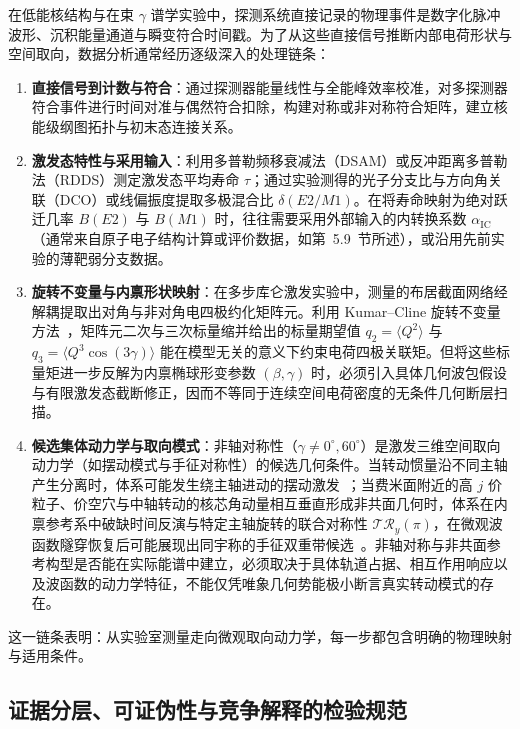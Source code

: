 在低能核结构与在束 $\gamma$ 谱学实验中，探测系统直接记录的物理事件是数字化脉冲波形、沉积能量通道与瞬变符合时间戳。为了从这些直接信号推断内部电荷形状与空间取向，数据分析通常经历逐级深入的处理链条：
\begin{enumerate}
    \item \textbf{直接信号到计数与符合}：通过探测器能量线性与全能峰效率校准，对多探测器符合事件进行时间对准与偶然符合扣除，构建对称或非对称符合矩阵，建立核能级纲图拓扑与初末态连接关系。
    \item \textbf{激发态特性与采用输入}：利用多普勒频移衰减法（DSAM）或反冲距离多普勒法（RDDS）测定激发态平均寿命 $\tau$；通过实验测得的光子分支比与方向角关联（DCO）或线偏振度提取多极混合比 $\delta(E2/M1)$。在将寿命映射为绝对跃迁几率 $B(E2)$ 与 $B(M1)$ 时，往往需要采用外部输入的内转换系数 $\alpha_{\text{IC}}$（通常来自原子电子结构计算或评价数据，如第~5.9~节所述），或沿用先前实验的薄靶弱分支数据。
    \item \textbf{旋转不变量与内禀形状映射}：在多步库仑激发实验中，测量的布居截面网络经解耦提取出对角与非对角电四极约化矩阵元。利用 Kumar--Cline 旋转不变量方法~\cite{cline-1986-nuclear-shapes-coulomb-excitation}，矩阵元二次与三次标量缩并给出的标量期望值 $q_2 = \langle Q^2 \rangle$ 与 $q_3 = \langle Q^3 \cos(3\gamma) \rangle$ 能在模型无关的意义下约束电荷四极关联矩。但将这些标量矩进一步反解为内禀椭球形变参数 $(\beta, \gamma)$ 时，必须引入具体几何波包假设与有限激发态截断修正，因而不等同于连续空间电荷密度的无条件几何断层扫描。
    \item \textbf{候选集体动力学与取向模式}：非轴对称性（$\gamma \ne 0^\circ, 60^\circ$）是激发三维空间取向动力学（如摆动模式与手征对称性）的候选几何条件。当转动惯量沿不同主轴产生分离时，体系可能发生绕主轴进动的摆动激发~\cite{bohr-mottelson-1953-collective-individual-original}；当费米面附近的高 $j$ 价粒子、价空穴与中轴转动的核芯角动量相互垂直形成非共面几何时，体系在内禀参考系中破缺时间反演与特定主轴旋转的联合对称性 $\mathcal{T}\mathcal{R}_y(\pi)$，在微观波函数隧穿恢复后可能展现出同宇称的手征双重带候选~\cite{petrache-2006-near-degenerate-chiral-misinterpretation}。非轴对称与非共面参考构型是否能在实际能谱中建立，必须取决于具体轨道占据、相互作用响应以及波函数的动力学特征，不能仅凭唯象几何势能极小断言真实转动模式的存在。
\end{enumerate}

这一链条表明：从实验室测量走向微观取向动力学，每一步都包含明确的物理映射与适用条件。

\subsection{证据分层、可证伪性与竞争解释的检验规范}\label{sec:1-5-2}

